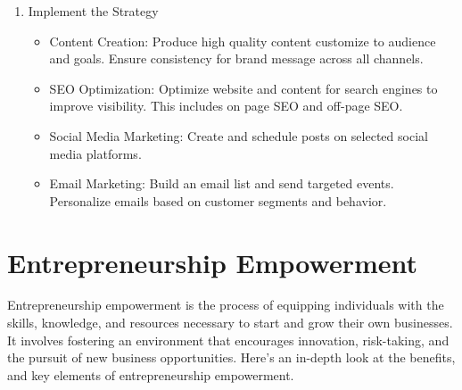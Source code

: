 \begin{enumerate}
    \item Implement the Strategy
    \begin{itemize}
        \item Content Creation: Produce high quality content customize to audience and goals. Ensure consistency for brand message across all channels.
        \item SEO Optimization: Optimize website and content for search engines to improve visibility. This includes on page SEO and off-page SEO.
        \item Social Media Marketing: Create and schedule posts on selected social media platforms. 
        \item Email Marketing: Build an email list and send targeted events. Personalize emails based on customer segments and behavior.
    \end{itemize}

\end{enumerate}

\section{Entrepreneurship Empowerment}
Entrepreneurship empowerment is the process of equipping individuals with the skills, knowledge, and resources necessary to start and grow their own businesses. It involves fostering an environment that encourages innovation, risk-taking, and the pursuit of new business opportunities. Here's an in-depth look at the benefits, and key elements of entrepreneurship empowerment.

